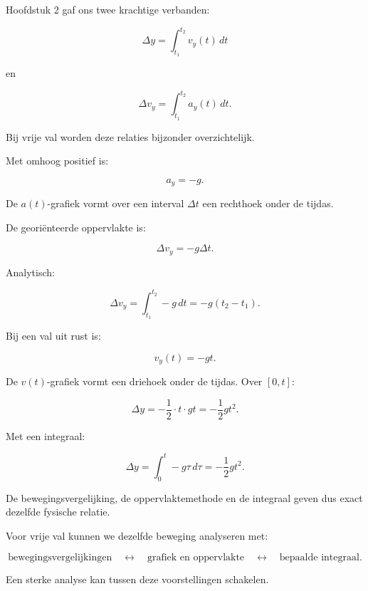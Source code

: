 \documentclass{ximera}
\begin{document}


Hoofdstuk 2 gaf ons twee krachtige verbanden:

\[
\Delta y
=
\int_{t_1}^{t_2}v_y(t)\,dt
\]

en

\[
\Delta v_y
=
\int_{t_1}^{t_2}a_y(t)\,dt.
\]

Bij vrije val worden deze relaties bijzonder overzichtelijk.



Met omhoog positief is:

\[
a_y=-g.
\]

De $a(t)$-grafiek vormt over een interval $\Delta t$ een rechthoek
onder de tijdas.

De georiënteerde oppervlakte is:

\[
\Delta v_y=-g\Delta t.
\]

Analytisch:

\[
\Delta v_y
=
\int_{t_1}^{t_2}-g\,dt
=
-g(t_2-t_1).
\]



Bij een val uit rust is:

\[
v_y(t)=-gt.
\]

De $v(t)$-grafiek vormt een driehoek onder de tijdas. Over $[0,t]$:

\[
\Delta y
=
-\frac12\cdot t\cdot gt
=
-\frac12gt^2.
\]

Met een integraal:

\[
\Delta y
=
\int_0^t -g\tau\,d\tau
=
-\frac12gt^2.
\]

De bewegingsvergelijking, de oppervlaktemethode en de integraal geven
dus exact dezelfde fysische relatie.


\begin{eigenschap}

Voor vrije val kunnen we dezelfde beweging analyseren met:

\[
\boxed{
\text{bewegingsvergelijkingen}
\quad\longleftrightarrow\quad
\text{grafiek en oppervlakte}
\quad\longleftrightarrow\quad
\text{bepaalde integraal}.
}
\]

Een sterke analyse kan tussen deze voorstellingen schakelen.

\end{eigenschap}
\end{document}
